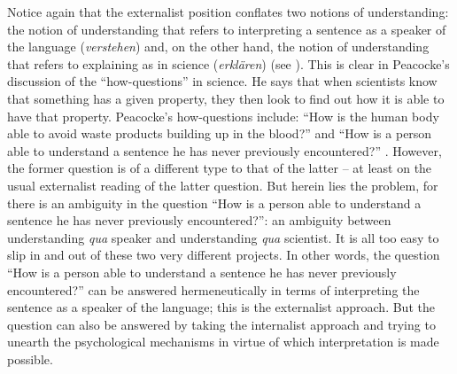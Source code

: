 Notice again that the externalist position conflates two notions of understanding: the notion of understanding that refers to interpreting a sentence as a speaker of the language (\textit{verstehen}) and, on the other hand, the notion of understanding that refers to explaining as in science (\textit{erklären}) (see \citealt{Slezak2004,Slezak2018}). This is clear in Peacocke's discussion of the “how-questions” in science. He says that when scientists know that something has a given property, they then look to find out how it is able to have that property. Peacocke’s how-questions include: “How is the human body able to avoid waste products building up in the blood?” and “How is a person able to understand a sentence he has never previously encountered?” \citep[315]{Peacocke1994}. However, the former question is of a different type to that of the latter – at least on the usual externalist reading of the latter question. But herein lies the problem, for there is an ambiguity in the question “How is a person able to understand a sentence he has never previously encountered?”: an ambiguity between understanding \textit{qua} speaker and understanding \textit{qua} scientist. It is all too easy to slip in and out of these two very different projects. In other words, the question “How is a person able to understand a sentence he has never previously encountered?” can be answered hermeneutically in terms of interpreting the sentence as a speaker of the language; this is the externalist approach. But the question can also be answered by taking the internalist approach and trying to unearth the psychological mechanisms in virtue of which interpretation is made possible.

